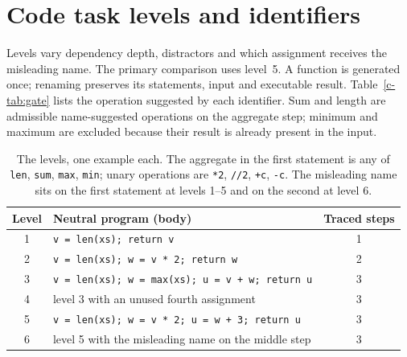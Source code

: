 

\section{Code task levels and identifiers}
\label{c-app:levels}

Levels vary dependency depth, distractors and which assignment receives the misleading name.
The primary comparison uses level~5. A function is generated once; renaming preserves its
statements, input and executable result. Table~\ref{c-tab:gate} lists the operation suggested by
each identifier. Sum and length are admissible name-suggested operations on the aggregate step; minimum
and maximum are excluded because their result is already present in the input.


\begin{table}[t]
\centering\small
\begin{tabular}{@{}clc@{}}
\toprule
Level & Neutral program (body) & Traced steps \\
\midrule
1 & \texttt{v = len(xs); return v} & 1 \\
2 & \texttt{v = len(xs); w = v * 2; return w} & 2 \\
3 & \texttt{v = len(xs); w = max(xs); u = v + w; return u} & 3 \\
4 & level 3 with an unused fourth assignment & 3 \\
5 & \texttt{v = len(xs); w = v * 2; u = w + 3; return u} & 3 \\
6 & level 5 with the misleading name on the middle step & 3 \\
\bottomrule
\end{tabular}
\caption{The levels, one example each. The aggregate in the first statement is any of
\texttt{len}, \texttt{sum}, \texttt{max}, \texttt{min}; unary operations are \texttt{*2},
\texttt{//2}, \texttt{+c}, \texttt{-c}. The misleading name sits on the first statement at
levels 1--5 and on the second at level 6.}
\label{c-tab:levels}
\end{table}

